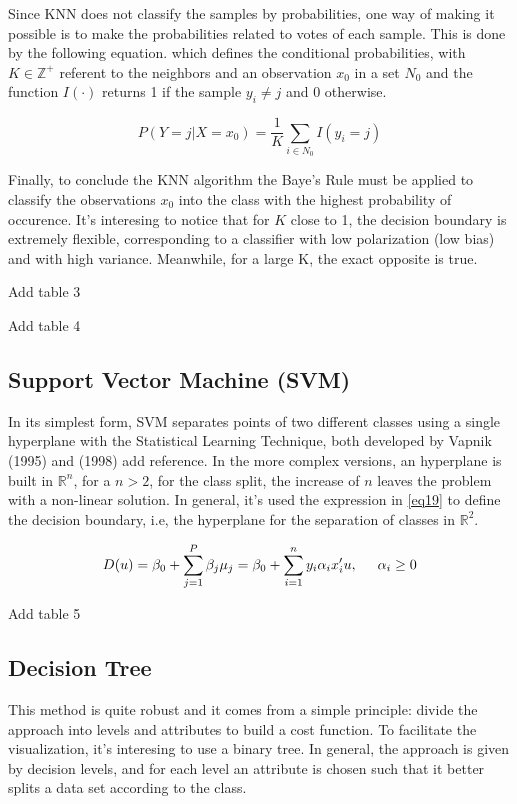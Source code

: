 \documentclass[conference]{IEEEtran}
\newcommand{\reviewUrgent}[1]{{\color{red} #1}} %
\begin{document}
Since KNN does not classify the samples by probabilities, one way of making it possible is to 
make the probabilities related to votes of each sample. This is done by the following 
equation. which defines the conditional probabilities, with $K \in \mathbb{Z}^{+}$ referent 
to the neighbors and an observation $x_0$ in a set $N_0$ and the function $I(\cdot)$
returns 1 if the sample $y_i \neq j$ and 0 otherwise.

\begin{equation}
    P(Y = j|X = x_0) = \frac{1}{K} \sum_{i \in N_0} I(y_i = j) 
\end{equation}

Finally, to conclude the KNN algorithm the Baye's Rule must be applied to classify the 
observations $x_0$ into the class with the highest probability of occurence. It's 
interesing to notice that for $K$ close to 1, the decision boundary is extremely 
flexible, corresponding to a classifier with low polarization (low bias) and with 
high variance. Meanwhile, for a large K, the exact opposite is true.

\reviewUrgent{Add table 3} 

\reviewUrgent{Add table 4}


\subsection{Support Vector Machine (SVM)}
\label{SVM}
In its simplest form, SVM separates points of two different classes using a single
hyperplane with the Statistical Learning Technique, both developed by Vapnik (1995) and (1998) \reviewUrgent{add reference}.
In the more complex versions, an hyperplane is built in $\mathbb{R}^n$, for a $n>2$, for 
the class split, the increase of $n$ leaves the problem with a non-linear solution. In general,
it's used the expression in \eqref{eq19} to define the decision boundary, i.e, the hyperplane
for the separation of classes in $\mathbb{R}^2$.

\begin{equation}
    D(u)=\beta_0 + \sum_{j=1}^P \beta_j\mu_j = \beta_0+\sum_{i = 1}^ny_i\alpha_ix_i'u, \hspace{0.5cm} \alpha_i \geq 0 \label{eq19}
\end{equation}

\reviewUrgent{Add table 5}

\subsection{Decision Tree}
\label{Decision Tree}
This method is quite robust and it comes from a simple principle: divide the approach
into levels and attributes to build a cost function. To facilitate the visualization,
it's interesing to use a binary tree. In general, the approach is given by decision levels,
and for each level an attribute is chosen such that it better splits a data set 
according to the class.
\end{document}
